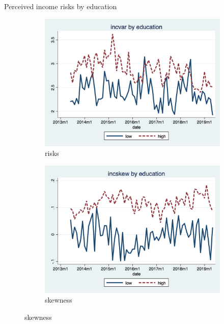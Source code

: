 \documentclass{beamer}
\begin{document}
\begin{frame}{Perceived income risks by education}
	\begin{figure}[ht]
		\label{ts_incvar_educ_g_mean}
		\begin{subfigure}[b]{0.7\textwidth}
			\centering
			\caption{risks}
			\includegraphics[width=\textwidth, height = 0.33\textheight]{figures/ts_incvar_edu_g_mean.png}
		\end{subfigure}
		\begin{subfigure}[b]{0.7\textwidth}
			\caption{skewness}
			\includegraphics[width=\textwidth, height = 0.33\textheight]{figures/ts_incskew_edu_g_mean.png}
		\end{subfigure}
	\end{figure}
\end{frame}
\end{document}

